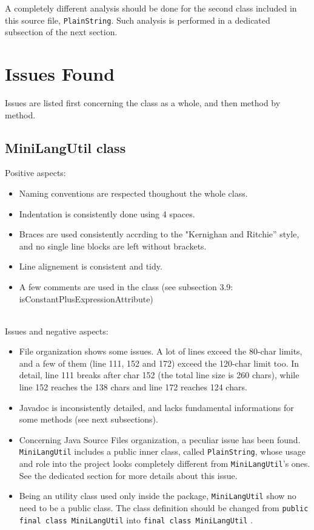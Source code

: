 \documentclass[11pt]{article} %
\begin{document}
A completely different analysis should be done for the second class included in this source file, \texttt{PlainString}. Such analysis is performed in a dedicated subsection of the next section.


\section{Issues Found}
Issues are listed first concerning the class as a whole, and then method by method.

\subsection{MiniLangUtil class}

Positive aspects:
\begin{itemize}[noitemsep]
	\item Naming conventions are respected thoughout the whole class.
	\item Indentation is consistently done using 4 spaces.
	\item Braces are used consistently accrding to the "Kernighan and Ritchie” style, and no single line blocks are left without brackets.
	\item Line alignement is consistent and tidy.
	\item A few comments are used in the class (see subsection 3.9: isConstantPlusExpressionAttribute)
\end{itemize}

\hfill\\
Issues and negative aspects:
\begin{itemize}
	\item File organization shows some issues. A lot of lines exceed the 80-char limits, and a few of them (line 111, 152 and 172) exceed the 120-char limit too. In detail, line 111 breaks after char 152 (the total line size is 260 chars), while line 152 reaches the 138 chars and line 172 reaches 124 chars.

	\item Javadoc is inconsistently detailed, and lacks fundamental informations for some methods (see next subsections).

	\item Concerning Java Source Files organization, a peculiar issue has been found. \texttt{MiniLangUtil} includes a public inner class, called \texttt{PlainString}, whose usage and role into the project looks completely different from \texttt{MiniLangUtil}'s ones. See the dedicated section for more details about this issue.

	\item Being an utility class used only inside the package, \texttt{MiniLangUtil} show no need to be a public class. The class definition should be changed from \texttt{public final class MiniLangUtil} into \texttt{final class MiniLangUtil}
. 

\end{itemize}
\end{document}
